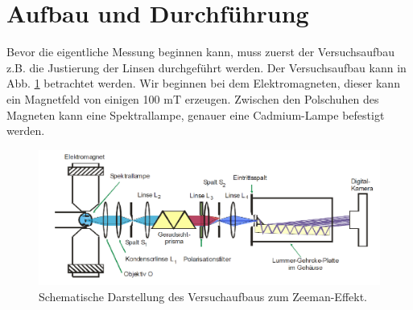 \section{Aufbau und Durchführung}
\label{sec:Durchführung}


Bevor die eigentliche Messung beginnen kann, muss zuerst der Versuchsaufbau z.B. die Justierung der Linsen durchgeführt werden.
Der Versuchsaufbau kann in Abb. \ref{fig:aufbau} betrachtet werden.
Wir beginnen bei dem Elektromagneten, dieser kann ein Magnetfeld von einigen 100 $\si{\milli \tesla}$ erzeugen.
Zwischen den Polschuhen des Magneten kann eine Spektrallampe, genauer eine Cadmium-Lampe befestigt werden.

\begin{figure}
    \centering
    \includegraphics[width=\textwidth]{content/data/aufbau.png}
    \caption{Schematische Darstellung des Versuchaufbaus zum Zeeman-Effekt.} %
    \label{fig:aufbau}
\end{figure}

